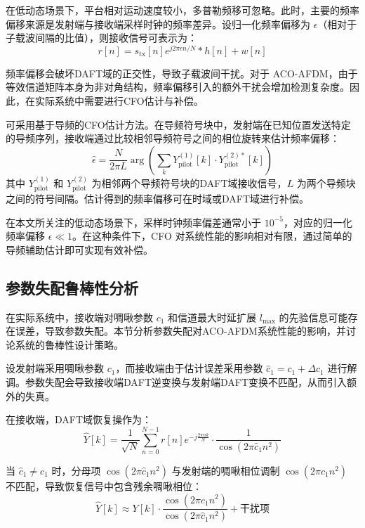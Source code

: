 在低动态场景下，平台相对运动速度较小，多普勒频移可忽略。此时，主要的频率偏移来源是发射端与接收端采样时钟的频率差异。设归一化频率偏移为 $\epsilon$（相对于子载波间隔的比值），则接收信号可表示为：
\begin{equation}
r[n] = s_{\mathrm{tx}}[n] e^{j2\pi\epsilon n/N} * h[n] + w[n]
\end{equation}

频率偏移会破坏DAFT域的正交性，导致子载波间干扰。对于 ACO-AFDM，由于等效信道矩阵本身为非对角结构，频率偏移引入的额外干扰会增加检测复杂度。因此，在实际系统中需要进行CFO估计与补偿。

可采用基于导频的CFO估计方法。在导频符号块中，发射端在已知位置发送特定的导频序列，接收端通过比较相邻导频符号之间的相位旋转来估计频率偏移：
\begin{equation}
\hat{\epsilon} = \frac{N}{2\pi L} \arg\left(\sum_{k} Y_{\mathrm{pilot}}^{(1)}[k] \cdot Y_{\mathrm{pilot}}^{(2)*}[k]\right)
\end{equation}
其中 $Y_{\mathrm{pilot}}^{(1)}$ 和 $Y_{\mathrm{pilot}}^{(2)}$ 为相邻两个导频符号块的DAFT域接收信号，$L$ 为两个导频块之间的符号间隔。估计得到的频率偏移可在时域或DAFT域进行补偿。

在本文所关注的低动态场景下，采样时钟频率偏差通常小于 $10^{-5}$，对应的归一化频率偏移 $\epsilon \ll 1$。在这种条件下，CFO 对系统性能的影响相对有限，通过简单的导频辅助估计即可实现有效补偿。

\subsection{参数失配鲁棒性分析}
\label{subsec:parameter_mismatch_robustness}

在实际系统中，接收端对啁啾参数 $c_1$ 和信道最大时延扩展 $l_{\max}$ 的先验信息可能存在误差，导致参数失配。本节分析参数失配对ACO-AFDM系统性能的影响，并讨论系统的鲁棒性设计策略。


设发射端采用啁啾参数 $c_1$，而接收端由于估计误差采用参数 $\hat{c}_1 = c_1 + \Delta c_1$ 进行解调。参数失配会导致接收端DAFT逆变换与发射端DAFT变换不匹配，从而引入额外的失真。

在接收端，DAFT域恢复操作为：
\begin{equation}
\hat{Y}[k] = \frac{1}{\sqrt{N}} \sum_{n=0}^{N-1} r[n] e^{-j \frac{2\pi nk}{N}} \cdot \frac{1}{\cos(2\pi \hat{c}_1 n^2)}
\end{equation}

当 $\hat{c}_1 \neq c_1$ 时，分母项 $\cos(2\pi \hat{c}_1 n^2)$ 与发射端的啁啾相位调制 $\cos(2\pi c_1 n^2)$ 不匹配，导致恢复信号中包含残余啁啾相位：
\begin{equation}
\hat{Y}[k] \approx Y[k] \cdot \frac{\cos(2\pi c_1 n^2)}{\cos(2\pi \hat{c}_1 n^2)} + \text{干扰项}
\end{equation}

